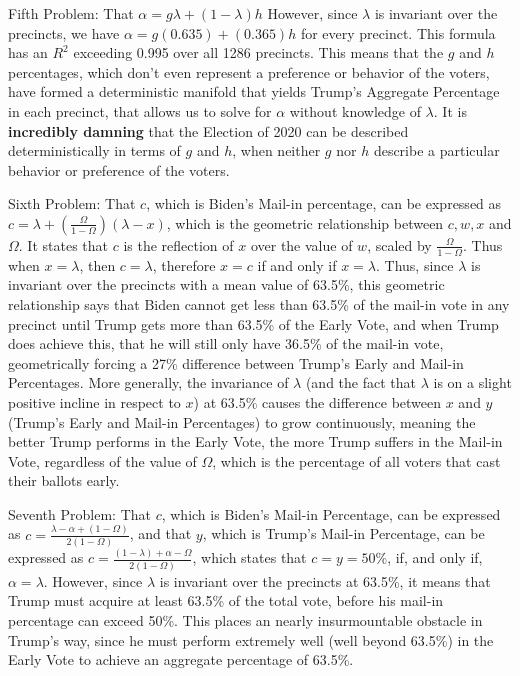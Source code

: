 Fifth Problem: That $\alpha=g\lambda+(1-\lambda)h$   However, since $\lambda$ is invariant over the precincts, we have $\alpha=g(0.635)+(0.365)h$ for every precinct. This formula has an $R^2$ exceeding 0.995 over all 1286 precincts.  This means that the $g$ and $h$ percentages, which don't even represent a preference or behavior of the voters, have formed a deterministic manifold that yields Trump's Aggregate Percentage in each precinct, that allows us to solve for $\alpha$ without knowledge of $\lambda$. It is \textbf{incredibly damning} that the Election of 2020  can be described deterministically in terms of $g$ and $h$, when neither $g$ nor $h$ describe a particular behavior or preference of the voters.

Sixth Problem: That $c$, which is Biden's Mail-in percentage, can be expressed as $c=\lambda+(\frac{\Omega}{1-\Omega})(\lambda-x)$, which is the geometric relationship between $c,w,x$ and $\Omega$. It states that $c$ is the reflection of $x$ over the value of $w$, scaled by $\frac{\Omega}{1-\Omega}$. Thus when $x=\lambda$, then $c=\lambda$, therefore $x=c$ if and only if $x=\lambda$. Thus, since $\lambda$ is invariant over the precincts with a mean value of 63.5\%, this geometric relationship says that Biden cannot get less than 63.5\% of the mail-in vote in any precinct until Trump gets more than 63.5\% of the Early Vote, and when Trump does achieve this, that he will still only have 36.5\% of the mail-in vote, geometrically forcing a 27\% difference between Trump's Early and Mail-in Percentages.  More generally, the invariance of $\lambda$ (and the fact that $\lambda$ is on a slight positive incline in respect to $x$) at 63.5\% causes the difference between $x$ and $y$ (Trump's Early and Mail-in Percentages) to grow continuously, meaning the better Trump performs in the Early Vote, the more Trump suffers in the Mail-in Vote, regardless of the value of $\Omega$, which is the percentage of all voters that cast their ballots early.

Seventh Problem: That $c$, which is Biden's Mail-in Percentage, can be expressed as $c=\frac{\lambda-\alpha+(1-\Omega)}{2(1-\Omega)}$, and that $y$, which is Trump's Mail-in Percentage, can be expressed as $c=\frac{(1-\lambda)+\alpha-\Omega}{2(1-\Omega)}$, which states that $c=y=50\%$, if, and only if, $\alpha=\lambda$.  However, since $\lambda$ is invariant over the precincts at 63.5\%, it means that Trump must acquire at least 63.5\% of the total vote, before his mail-in percentage can exceed 50\%. This places an nearly insurmountable obstacle in Trump's way, since he must perform extremely well (well beyond 63.5\%) in the Early Vote to achieve an aggregate percentage of 63.5\%.

